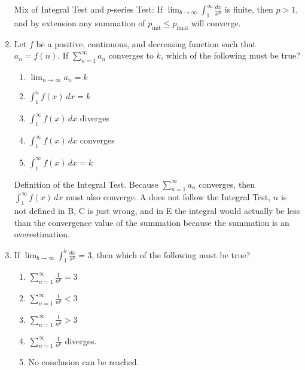 \documentclass[10pt,letterpaper]{report}
\begin{document}
\begin{enumerate}
    Mix of Integral Test and $p$-series Test: If $\lim_{b\to\infty}\int_{1}^{\infty}{\frac{dx}{x^{p}}}$ is finite, then $p > 1$, and by extension any summation of $p_{\text{init}} \leq p_{\text{final}}$ will converge. \\
    
  \pagebreak
    
  \item{Let $f$ be a positive, continuous, and decreasing function such that $a_{n}=f(n)$. If $\sum_{n=1}^{\infty}{a_{n}}$ converges to $k$, which of the following must be true?}
  \begin{enumerate}
    \item{$\lim_{n\to\infty}a_{n} = k$ \\}
    \item{$\int_{1}^{n}{f(x)}\,dx = k$ \\}
    \item{$\int_{1}^{\infty}{f(x)}\,dx$ diverges \\}
    \item{$\int_{1}^{\infty}{f(x)}\,dx$ converges \\}
    \item{$\int_{1}^{\infty}{f(x)}\,dx = k$ \\}
  \end{enumerate}
  
  Definition of the Integral Test. Because $\sum_{n=1}^{\infty}{a_{n}}$ converges, then $\int_{1}^{\infty}{f(x)}\,dx$ must also converge. A does not follow the Integral Test, $n$ is not defined in B, C is just wrong, and in E the integral would actually be less than the convergence value of the summation because the summation is an overestimation. \\
  
  \hline
  
  \item{If $\lim_{b\to\infty}\int_{1}^{b}{\frac{dx}{x^{p}}} = 3$, then which of the following must be true?}
  \begin{enumerate}
    \item{$\sum_{n=1}^{\infty}\frac{1}{n^{p}} = 3$ \\}
    \item{$\sum_{n=1}^{\infty}\frac{1}{n^{p}} < 3$ \\}
    \item{$\sum_{n=1}^{\infty}\frac{1}{n^{p}} > 3$ \\}
    \item{$\sum_{n=1}^{\infty}\frac{1}{n^{p}}$ diverges. \\}
    \item{No conclusion can be reached. \\}
  \end{enumerate}
  

\end{enumerate}
\end{document}
